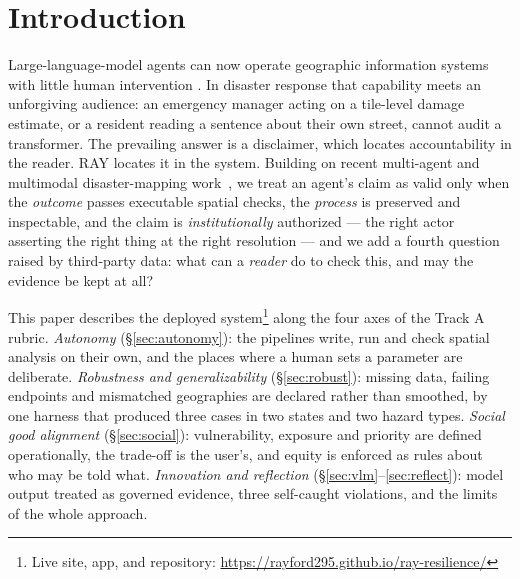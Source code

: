 \documentclass[sigconf,screen]{acmart}
\begin{document}

\maketitle

\section{Introduction}

Large-language-model agents can now operate geographic information
systems with little human intervention
\cite{li2023autonomous,zhang2024geogpt}. In disaster response that
capability meets an unforgiving audience: an emergency manager acting on a
tile-level damage estimate, or a resident reading a sentence about their
own street, cannot audit a transformer. The prevailing answer is a
disclaimer, which locates accountability in the reader. RAY locates it in
the system. Building on recent multi-agent and multimodal disaster-mapping
work~\cite{yang2026rapid,yang2026rapidmap,yang2026damagearbiter}, we treat an
agent's claim as valid only when the \emph{outcome} passes executable spatial
checks, the \emph{process} is preserved and inspectable, and the claim is
\emph{institutionally} authorized --- the right actor asserting the right
thing at the right resolution --- and we add a fourth question raised by
third-party data: what can a \emph{reader} do to check this, and may the
evidence be kept at all?

This paper describes the deployed system\footnote{Live site, app, and
repository: \url{https://rayford295.github.io/ray-resilience/}} along the
four axes of the Track A rubric. \emph{Autonomy} (\S\ref{sec:autonomy}):
the pipelines write, run and check spatial analysis on their own, and the
places where a human sets a parameter are deliberate. \emph{Robustness and
generalizability} (\S\ref{sec:robust}): missing data, failing endpoints and
mismatched geographies are declared rather than smoothed, by one harness
that produced three cases in two states and two hazard types.
\emph{Social good alignment} (\S\ref{sec:social}): vulnerability, exposure
and priority are defined operationally, the trade-off is the user's, and
equity is enforced as rules about who may be told what. \emph{Innovation
and reflection} (\S\ref{sec:vlm}--\ref{sec:reflect}): model output treated
as governed evidence, three self-caught violations, and the limits of the
whole approach.
\end{document}
